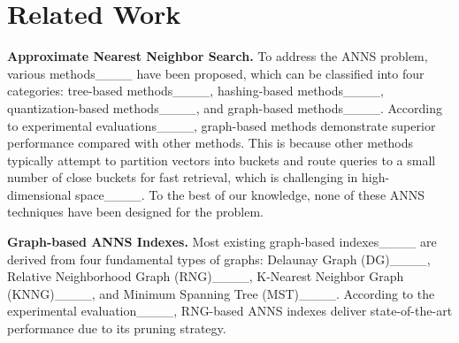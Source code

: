 \section{Related Work}
\label{sec:related}

\noindent\textbf{Approximate Nearest Neighbor Search.} To address the ANNS problem, various methods____ have been proposed, which can be classified into four categories: tree-based methods____, hashing-based methods____, quantization-based methods____, and graph-based methods____. According to experimental evaluations____, graph-based methods demonstrate superior performance compared with other methods. %
This is because 
other methods typically attempt to partition vectors into buckets and route queries to a small number of close buckets for fast retrieval, which is challenging in high-dimensional space____. 
To the best of our knowledge, none of these ANNS techniques have been %
designed 
for the \hvq problem.


\noindent\textbf{Graph-based ANNS Indexes.} 
Most existing graph-based indexes____ are derived from four fundamental types of graphs: Delaunay Graph (DG)____, Relative Neighborhood Graph (RNG)____, K-Nearest Neighbor Graph (KNNG)____, and Minimum Spanning Tree (MST)____. 
According to the experimental evaluation____, RNG-based ANNS indexes deliver state-of-the-art performance 
due to its pruning strategy. 

